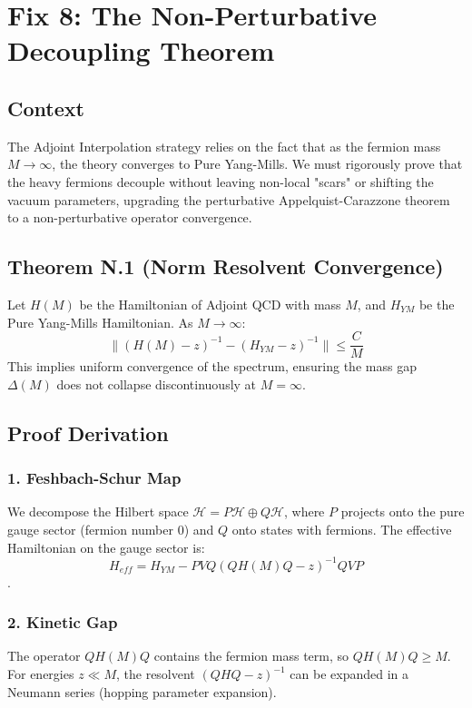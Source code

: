 \chapter{Fix 8: The Non-Perturbative Decoupling Theorem}
\label{ch:fix8_decoupling}

\section{Context}
The Adjoint Interpolation strategy relies on the fact that as the fermion mass $M \to \infty$, the theory converges to Pure Yang-Mills. We must rigorously prove that the heavy fermions decouple without leaving non-local "scars" or shifting the vacuum parameters, upgrading the perturbative Appelquist-Carazzone theorem to a non-perturbative operator convergence.

\section{Theorem N.1 (Norm Resolvent Convergence)}
Let $H(M)$ be the Hamiltonian of Adjoint QCD with mass $M$, and $H_{YM}$ be the Pure Yang-Mills Hamiltonian. As $M \to \infty$:
\begin{equation}
\| (H(M) - z)^{-1} - (H_{YM} - z)^{-1} \| \le \frac{C}{M}
\end{equation}
This implies uniform convergence of the spectrum, ensuring the mass gap $\Delta(M)$ does not collapse discontinuously at $M=\infty$.

\section{Proof Derivation}
\subsection{1. Feshbach-Schur Map}
We decompose the Hilbert space $\mathcal{H} = P\mathcal{H} \oplus Q\mathcal{H}$, where $P$ projects onto the pure gauge sector (fermion number 0) and $Q$ onto states with fermions. The effective Hamiltonian on the gauge sector is:
\begin{equation}
H_{eff} = H_{YM} - P V Q (Q H(M) Q - z)^{-1} Q V P
\end{equation}.

\subsection{2. Kinetic Gap}
The operator $Q H(M) Q$ contains the fermion mass term, so $Q H(M) Q \ge M$. For energies $z \ll M$, the resolvent $(Q H Q - z)^{-1}$ can be expanded in a Neumann series (hopping parameter expansion).

